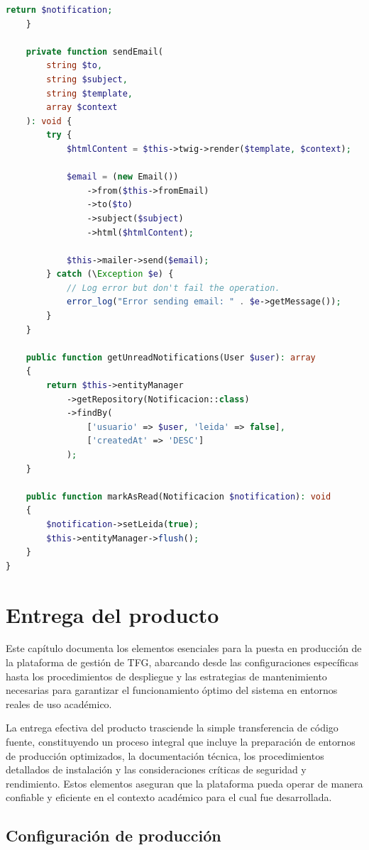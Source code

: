 \documentclass[12pt,a4paper,oneside]{report}
\begin{document}
\begin{lstlisting}[language=PHP]
        return $notification;
    }

    private function sendEmail(
        string $to,
        string $subject,
        string $template,
        array $context
    ): void {
        try {
            $htmlContent = $this->twig->render($template, $context);

            $email = (new Email())
                ->from($this->fromEmail)
                ->to($to)
                ->subject($subject)
                ->html($htmlContent);

            $this->mailer->send($email);
        } catch (\Exception $e) {
            // Log error but don't fail the operation.
            error_log("Error sending email: " . $e->getMessage());
        }
    }

    public function getUnreadNotifications(User $user): array
    {
        return $this->entityManager
            ->getRepository(Notificacion::class)
            ->findBy(
                ['usuario' => $user, 'leida' => false],
                ['createdAt' => 'DESC']
            );
    }

    public function markAsRead(Notificacion $notification): void
    {
        $notification->setLeida(true);
        $this->entityManager->flush();
    }
}
\end{lstlisting}

\chapter{Entrega del producto}\label{entrega-del-producto}
Este capítulo documenta los elementos esenciales para la puesta en producción de la plataforma de gestión de TFG, abarcando desde las configuraciones específicas hasta los procedimientos de despliegue y las estrategias de mantenimiento necesarias para garantizar el funcionamiento óptimo del sistema en entornos reales de uso académico.

La entrega efectiva del producto trasciende la simple transferencia de código fuente, constituyendo un proceso integral que incluye la preparación de entornos de producción optimizados, la documentación técnica, los procedimientos detallados de instalación y las consideraciones críticas de seguridad y rendimiento. Estos elementos aseguran que la plataforma pueda operar de manera confiable y eficiente en el contexto académico para el cual fue desarrollada.

\section{Configuración de
producción}\label{configuraciuxf3n-de-producciuxf3n}
\end{document}
